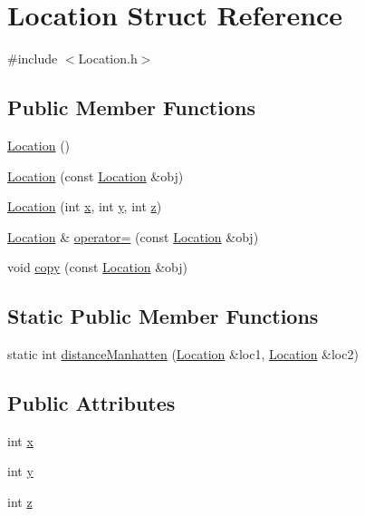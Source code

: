 \hypertarget{structLocation}{\section{Location Struct Reference}
\label{structLocation}
}


{\ttfamily \#include $<$Location.\-h$>$}

\subsection*{Public Member Functions}
\begin{DoxyCompactItemize}
\item 
\hyperlink{structLocation_a87790c14997fd8cdd12080c78c9794bb}{Location} ()
\item 
\hyperlink{structLocation_a02b70305fcef2e7913e5282bbafe7833}{Location} (const \hyperlink{structLocation}{Location} \&obj)
\item 
\hyperlink{structLocation_ada7ef731cfa1f39a6512b3e6eecf434d}{Location} (int \hyperlink{structLocation_aea76eebc474e30c04c53e5f03c6749e3}{x}, int \hyperlink{structLocation_a307809776b981810147af56d9304e273}{y}, int \hyperlink{structLocation_ad46e606795ee67a3775a53da49b37284}{z})
\item 
\hyperlink{structLocation}{Location} \& \hyperlink{structLocation_a4872cfb218bcb4c430a020f9e152866a}{operator=} (const \hyperlink{structLocation}{Location} \&obj)
\item 
void \hyperlink{structLocation_a4779c67a789befcb983db6d815ae9812}{copy} (const \hyperlink{structLocation}{Location} \&obj)
\end{DoxyCompactItemize}
\subsection*{Static Public Member Functions}
\begin{DoxyCompactItemize}
\item 
static int \hyperlink{structLocation_af727f5d24fa01128440c31948865d2b2}{distance\-Manhatten} (\hyperlink{structLocation}{Location} \&loc1, \hyperlink{structLocation}{Location} \&loc2)
\end{DoxyCompactItemize}
\subsection*{Public Attributes}
\begin{DoxyCompactItemize}
\item 
int \hyperlink{structLocation_aea76eebc474e30c04c53e5f03c6749e3}{x}
\item 
int \hyperlink{structLocation_a307809776b981810147af56d9304e273}{y}
\item 
int \hyperlink{structLocation_ad46e606795ee67a3775a53da49b37284}{z}
\end{DoxyCompactItemize}


